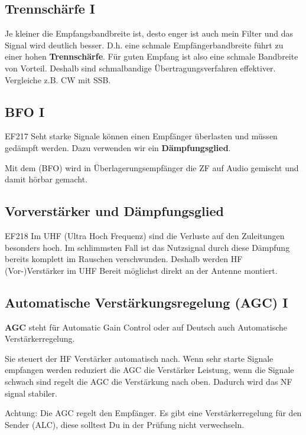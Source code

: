 \subsection{Trennschärfe I }
\begin{ohmchapter}
Je kleiner die Empfangsbandbreite ist, desto enger ist auch mein Filter und das Signal wird deutlich besser. D.h. eine schmale Empfängerbandbreite führt zu einer hohen \textbf{Trennschärfe}. Für guten Empfang ist also eine schmale Bandbreite von Vorteil. Deshalb sind schmalbandige Übertragungsverfahren effektiver. Vergleiche z.B. CW mit SSB. 
\end{ohmchapter}  

\subsection{BFO I}

\begin{sol}{EF217}
  Seht starke Signale können einen Empfänger überlasten und müssen gedämpft werden. Dazu verwenden wir ein \textbf{Dämpfungsglied}.
\end{sol} 

\begin{ohmchapter}
Mit dem  (BFO) wird in Überlagerungsempfänger die ZF auf Audio gemischt und damit hörbar gemacht.
\end{ohmchapter}  
\subsection{Vorverstärker und Dämpfungsglied}



\begin{sol}{EF218}
Im UHF (Ultra Hoch Frequenz) sind die Verluste auf den Zuleitungen besonders hoch. Im schlimmsten Fall ist das Nutzsignal durch diese Dämpfung bereits komplett im Rauschen verschwunden. Deshalb werden HF (Vor-)Verstärker im UHF Bereit möglichst direkt an der Antenne montiert.
\end{sol} 

\begin{ohmchapter}
\end{ohmchapter}  

\subsection{Automatische Verstärkungsregelung (AGC) I} \label{agc}
\begin{ohmchapter}
  \textbf{AGC} steht für Automatic Gain Control oder auf Deutsch auch Automatische Verstärkerregelung. 

  Sie steuert der HF Verstärker automatisch nach. Wenn sehr starte Signale empfangen werden reduziert die AGC die Verstärker Leistung, wenn die Signale schwach sind regelt die AGC die Verstärkung nach oben.
  Dadurch wird das NF signal stabiler.

  Achtung: Die AGC regelt den Empfänger. Es gibt eine Verstärkerregelung für den Sender (ALC), diese solltest Du in der Prüfung nicht verwechseln.
\end{ohmchapter}  

